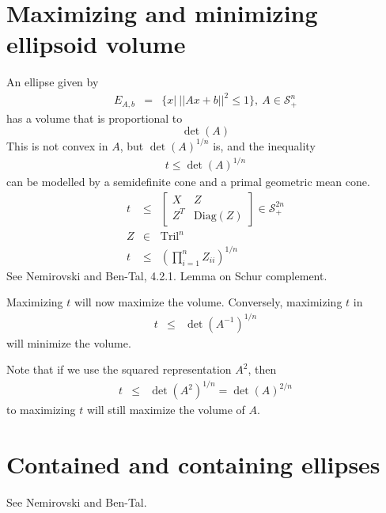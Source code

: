 \documentclass{article}
\begin{document}
\section{Maximizing and minimizing ellipsoid volume}

An ellipse given by
\begin{eqnarray}
    E_{A,b} &=& \{ x | \  || Ax+b ||^2 \leq 1\},\  A\in\mathcal{S}^n_+
\end{eqnarray}
has a volume that is proportional to
\[
    \det(A)
\]
This is not convex in $A$, but $\det(A)^{1/n}$ is, and the inequality
\begin{eqnarray}
    t\leq \det(A)^{1/n}
\end{eqnarray}
can be modelled by a semidefinite cone and a primal geometric mean cone.
\begin{eqnarray}
    t &\leq& 
    \left[
        \begin{array}{cc}
            X & Z \\
            Z^T & \mathrm{Diag}(Z)
        \end{array}
    \right]
    \in\mathcal{S}^{2n}_+ \\
    Z & \in & \mathrm{Tril}^n \\
    t & \leq & \left( \prod^n_{i=1} Z_{ii}\right)^{1/n}
\end{eqnarray}
See Nemirovski and Ben-Tal, 4.2.1. Lemma on Schur complement. 

Maximizing $t$ will now maximize the volume. Conversely, maximizing $t$ in 
\begin{eqnarray}
    t &\leq& \det(A^{-1})^{1/n}
\end{eqnarray}
will minimize the volume.

Note that if we use the squared representation $A^2$, then
\begin{eqnarray}
    t &\leq& \det(A^{2})^{1/n} = \det(A)^{2/n}
\end{eqnarray}
to maximizing $t$ will still maximize the volume of $A$.


\section{Contained and containing ellipses}

See Nemirovski and Ben-Tal.
\end{document}
